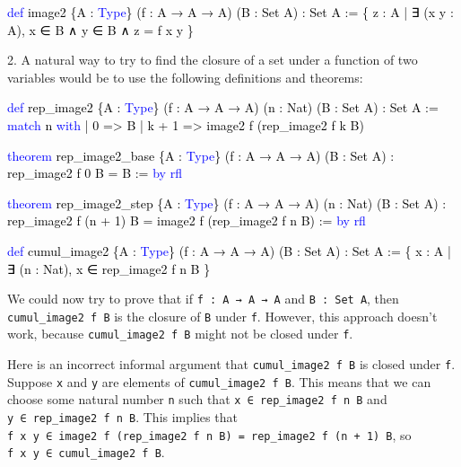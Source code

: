 \documentclass[
  letterpaper,
  DIV=11,
  numbers=noendperiod]{scrreprt}
\newenvironment{Shaded}{\begin{snugshade}}{\end{snugshade}}
\newcommand{\KeywordTok}[1]{\textcolor[rgb]{0.00,0.23,0.31}{#1}}
\newcommand{\NormalTok}[1]{\textcolor[rgb]{0.00,0.23,0.31}{#1}}
\renewcommand{\NormalTok}[1]{\textcolor[HTML]{000000}{#1}}
\renewcommand{\KeywordTok}[1]{\textcolor[HTML]{0000FF}{#1}}
\theoremstyle{remark}
\begin{document}
\begin{Shaded}
\begin{Highlighting}[]
\KeywordTok{def}\NormalTok{ image2 \{A : }\KeywordTok{Type}\NormalTok{\} (f : A → A → A) (B : Set A) : Set A :=}
\NormalTok{  \{ z : A | ∃ (x y : A), x ∈ B ∧ y ∈ B ∧ z = f x y \}}
\end{Highlighting}
\end{Shaded}

2. A natural way to try to find the closure of a set under a function of
two variables would be to use the following definitions and theorems:

\begin{Shaded}
\begin{Highlighting}[]
\KeywordTok{def}\NormalTok{ rep\_image2 \{A : }\KeywordTok{Type}\NormalTok{\}}
\NormalTok{    (f : A → A → A) (n : Nat) (B : Set A) : Set A :=}
  \KeywordTok{match}\NormalTok{ n }\KeywordTok{with}
\NormalTok{    | 0 =\textgreater{} B}
\NormalTok{    | k + 1 =\textgreater{} image2 f (rep\_image2 f k B)}

\KeywordTok{theorem}\NormalTok{ rep\_image2\_base \{A : }\KeywordTok{Type}\NormalTok{\} (f : A → A → A) (B : Set A) :}
\NormalTok{    rep\_image2 f 0 B = B := }\KeywordTok{by} \KeywordTok{rfl}

\KeywordTok{theorem}\NormalTok{ rep\_image2\_step \{A : }\KeywordTok{Type}\NormalTok{\}}
\NormalTok{    (f : A → A → A) (n : Nat) (B : Set A) :}
\NormalTok{    rep\_image2 f (n + 1) B = image2 f (rep\_image2 f n B) := }\KeywordTok{by} \KeywordTok{rfl}

\KeywordTok{def}\NormalTok{ cumul\_image2 \{A : }\KeywordTok{Type}\NormalTok{\} (f : A → A → A) (B : Set A) : Set A :=}
\NormalTok{  \{ x : A | ∃ (n : Nat), x ∈ rep\_image2 f n B \}}
\end{Highlighting}
\end{Shaded}

We could now try to prove that if \texttt{f\ :\ A\ →\ A\ →\ A} and
\texttt{B\ :\ Set\ A}, then \texttt{cumul\_image2\ f\ B} is the closure
of \texttt{B} under \texttt{f}. However, this approach doesn't work,
because \texttt{cumul\_image2\ f\ B} might not be closed under
\texttt{f}.

Here is an incorrect informal argument that \texttt{cumul\_image2\ f\ B}
is closed under \texttt{f}. Suppose \texttt{x} and \texttt{y} are
elements of \texttt{cumul\_image2\ f\ B}. This means that we can choose
some natural number \texttt{n} such that
\texttt{x\ ∈\ rep\_image2\ f\ n\ B} and
\texttt{y\ ∈\ rep\_image2\ f\ n\ B}. This implies that
\texttt{f\ x\ y\ ∈\ image2\ f\ (rep\_image2\ f\ n\ B)\ =\ rep\_image2\ f\ (n\ +\ 1)\ B},
so \texttt{f\ x\ y\ ∈\ cumul\_image2\ f\ B}.
\end{document}
